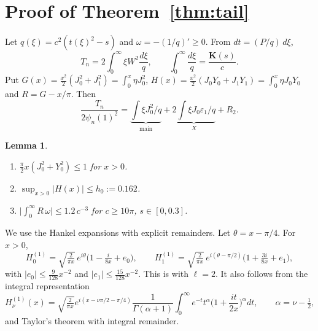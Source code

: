 \documentclass[11pt]{amsart}
\newtheorem{lemma}[proposition]{Lemma}
\theoremstyle{remark}
\numberwithin{equation}{section}
\newcommand{\Kell}{\mathbf{K}}
\begin{document}
\section{Proof of Theorem~\ref{thm:tail}}\label{sec:tail}

Let $q(\xi)=c^2(t(\xi)^2-s)$ and $\omega=-(1/q)'\ge0$. From $dt=(P/q)\,d\xi$,
\[
T_n=2\int_0^\infty\xi W^2\frac{d\xi}q,\qquad\int_0^\infty\frac{d\xi}q=\frac{\Kell(s)}c.
\]
Put $G(x)=\tfrac{x^2}2(J_0^2+J_1^2)=\int_0^x\eta J_0^2$, $H(x)=\tfrac{x^2}2(J_0Y_0+J_1Y_1)=\int_0^x\eta J_0Y_0$ and $R=G-x/\pi$. Then
\[
\frac{T_n}{2\psi_n(1)^2}=\underbrace{\int\xi J_0^2/q}_{\text{main}}+\underbrace{2\int\xi J_0\varepsilon_1/q}_{X}+R_2.
\]

\begin{lemma}\label{lem:bessel}
\begin{enumerate}
\item[(BL1)] $\frac\pi2x(J_0^2+Y_0^2)\le1$ for $x>0$.
\item[(BL2)] $\sup_{x>0}|H(x)|\le h_0:=0.162$.
\item[(BL3)] $\big|\int_0^\infty R\,\omega\big|\le1.2\,c^{-3}$ for $c\ge10\pi$, $s\in[0,0.3]$.
\end{enumerate}
\end{lemma}
We use the Hankel expansions with explicit remainders. Let $\theta=x-\pi/4$. For $x>0$,
\begin{equation}\label{eq:hankel}
H^{(1)}_0=\sqrt{\tfrac2{\pi x}}\,e^{i\theta}\big(1-\tfrac i{8x}+e_0\big),\qquad
H^{(1)}_1=\sqrt{\tfrac2{\pi x}}\,e^{i(\theta-\pi/2)}\big(1+\tfrac{3i}{8x}+e_1\big),
\end{equation}
with $|e_0|\le\frac{9}{128}x^{-2}$ and $|e_1|\le\frac{15}{128}x^{-2}$. This is \cite[10.17(iii)]{DLMF} with $\ell=2$. It also follows from the integral representation
\[
H^{(1)}_\nu(x)=\sqrt{\tfrac2{\pi x}}e^{i(x-\nu\pi/2-\pi/4)}\frac1{\Gamma(\alpha+1)}\int_0^\infty e^{-t}t^\alpha\Big(1+\frac{it}{2x}\Big)^\alpha dt,\qquad\alpha=\nu-\tfrac12,
\]
and Taylor's theorem with integral remainder.
\end{document}
